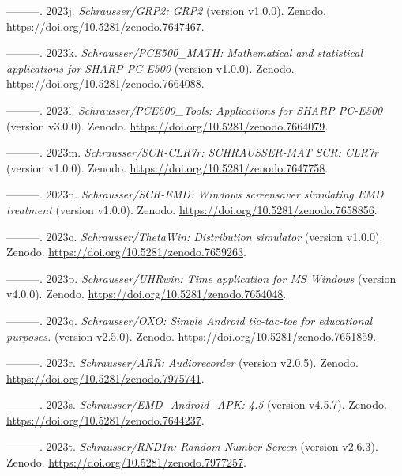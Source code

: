 \documentclass[
]{article}
\newlength{\cslhangindent}
\newlength{\cslentryspacingunit} %
\newenvironment{CSLReferences}[2] %
 {%
  \setlength{\parindent}{0pt}
  \ifodd #1
  \let\oldpar\par
  \def\par{\hangindent=\cslhangindent\oldpar}
  \fi
  \setlength{\parskip}{#2\cslentryspacingunit}
 }%
 {}
\begin{document}
\begin{CSLReferences}{1}{0}
\leavevmode{}%
---------. 2023j. \emph{{Schrausser/GRP2: GRP2}} (version {v1.0.0}).
Zenodo. \url{https://doi.org/10.5281/zenodo.7647467}.

\leavevmode{}%
---------. 2023k. \emph{{Schrausser/PCE500\_MATH: Mathematical and
statistical applications for SHARP PC-E500}} (version v1.0.0). Zenodo.
\url{https://doi.org/10.5281/zenodo.7664088}.

\leavevmode{}%
---------. 2023l. \emph{{Schrausser/PCE500\_Tools: Applications for
SHARP PC-E500}} (version v3.0.0). Zenodo.
\url{https://doi.org/10.5281/zenodo.7664079}.

\leavevmode{}%
---------. 2023m. \emph{{Schrausser/SCR-CLR7r: SCHRAUSSER-MAT SCR:
CLR7r}} (version v1.0.0). Zenodo.
\url{https://doi.org/10.5281/zenodo.7647758}.

\leavevmode{}%
---------. 2023n. \emph{{Schrausser/SCR-EMD: Windows screensaver
simulating EMD treatment}} (version v1.0.0). Zenodo.
\url{https://doi.org/10.5281/zenodo.7658856}.

\leavevmode{}%
---------. 2023o. \emph{{Schrausser/ThetaWin: Distribution simulator}}
(version v1.0.0). Zenodo. \url{https://doi.org/10.5281/zenodo.7659263}.

\leavevmode{}%
---------. 2023p. \emph{{Schrausser/UHRwin: Time application for MS
Windows}} (version v4.0.0). Zenodo.
\url{https://doi.org/10.5281/zenodo.7654048}.

\leavevmode{}%
---------. 2023q. \emph{{Schrausser/OXO: Simple Android tic-tac-toe for
educational purposes.}} (version v2.5.0). Zenodo.
\url{https://doi.org/10.5281/zenodo.7651859}.

\leavevmode{}%
---------. 2023r. \emph{{Schrausser/ARR: Audiorecorder}} (version
v2.0.5). Zenodo. \url{https://doi.org/10.5281/zenodo.7975741}.

\leavevmode{}%
---------. 2023s. \emph{{Schrausser/EMD\_Android\_APK: 4.5}} (version
{v4.5.7}). Zenodo. \url{https://doi.org/10.5281/zenodo.7644237}.

\leavevmode{}%
---------. 2023t. \emph{{Schrausser/RND1n: Random Number Screen}}
(version v2.6.3). Zenodo. \url{https://doi.org/10.5281/zenodo.7977257}.


\end{CSLReferences}
\end{document}
